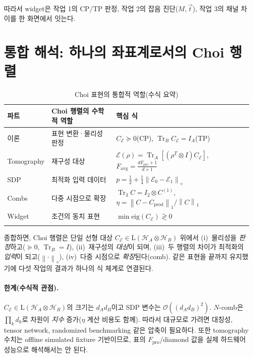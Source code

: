\documentclass[11pt,a4paper]{article}
\newcommand{\E}{\mathcal{E}}
\newcommand{\Hcal}{\mathcal{H}}
\newcommand{\Tr}{\operatorname{Tr}}
\newcommand{\Lin}{\mathrm{L}}
\newcommand{\diamondnorm}[1]{\left\lVert #1 \right\rVert_{\diamond}}
\newcommand{\onenorm}[1]{\left\lVert #1 \right\rVert_{1}}
\theoremstyle{definition}
\theoremstyle{plain}
\theoremstyle{remark}
\begin{document}
따라서 widget은 작업 1의 CP/TP 판정, 작업 2의 잡음 진단($M,\vec t$), 작업 3의 채널 차이를 한 화면에서 잇는다.

\section{통합 해석: 하나의 좌표계로서의 Choi 행렬}

\begin{longtable}{p{}p{}p{}}
\toprule
파트 & Choi 행렬의 수학적 역할 & 핵심 식 \\
\midrule
이론 & 표현 변환·물리성 판정 & $C_\E\succeq0$(CP), $\Tr_B C_\E=I_A$(TP) \\
Tomography & 재구성 대상 & $\E(\rho)=\Tr_A[(\rho^T\otimes I)C_\E]$, $F_{\mathrm{avg}}=\frac{dF_{\mathrm{pro}}+1}{d+1}$ \\
SDP & 최적화 입력 데이터 & $p=\tfrac12+\tfrac14\diamondnorm{\E_0-\E_1}$ \\
Combs & 다중 시점으로 확장 & $\Tr_3 C=I_2\otimes C^{(1)}$, $\eta=\onenorm{C-C_{\mathrm{prod}}}/\onenorm{C}$ \\
Widget & 조건의 동치 표현 & $\min\mathrm{eig}(C_\E)\gtrless0$ \\
\bottomrule
\caption{Choi 표현의 통합적 역할(수식 요약)}
\label{tab:integration}
\end{longtable}

종합하면, Choi 행렬은 단일 선형 대상 $C_\E\in\Lin(\Hcal_A\otimes\Hcal_B)$ 위에서 (i)~물리성을 \emph{판정}하고($\succeq0$, $\Tr_B=I$), (ii)~재구성의 \emph{대상}이 되며, (iii)~두 행렬의 차이가 최적화의 \emph{입력}이 되고($\diamondnorm{\cdot}$), (iv)~다중 시점으로 \emph{확장}된다(comb). 같은 표현을 끝까지 유지했기에 다섯 작업의 결과가 하나의 식 체계로 연결된다.

\paragraph{한계(수식적 관점).}
$C_\E\in\Lin(\Hcal_A\otimes\Hcal_B)$의 크기는 $d_Ad_B$이고 SDP 변수는 $\mathcal O((d_Ad_B)^2)$. $N$-comb은 $\prod_k d_k$로 차원이 \emph{지수} 증가($\eta$ 계산 비용도 함께). 따라서 대규모로 가려면 대칭성, tensor network, randomized benchmarking 같은 압축이 필요하다. 또한 tomography 수치는 offline simulated fixture 기반이므로, 표의 $F_{\mathrm{pro}}$/diamond 값을 실제 하드웨어 성능으로 해석해서는 안 된다.
\end{document}
